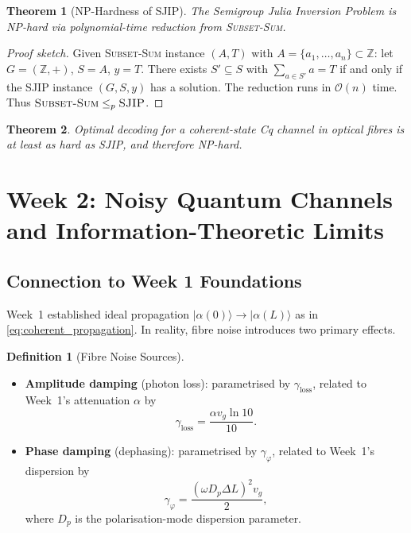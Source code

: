 \documentclass[journal,twocolumn]{IEEEtran}
\theoremstyle{definition}
\newtheorem{definition}{Definition}[section]
\theoremstyle{plain}
\newtheorem{theorem}{Theorem}[section]
\newcommand{\Z}{\mathbb{Z}}
\begin{document}
\begin{theorem}[NP-Hardness of SJIP]
The Semigroup Julia Inversion Problem is NP-hard via polynomial-time
reduction from \textsc{Subset-Sum}.
\end{theorem}

\begin{proof}[Proof sketch]
Given \textsc{Subset-Sum} instance $(A,T)$ with
$A=\{a_1,\dots,a_n\}\subset\Z$: let $G=(\Z,+)$, $S=A$, $y=T$.
There exists $S'\subseteq S$ with $\sum_{a\in S'}a=T$ if and only if
the SJIP instance $(G,S,y)$ has a solution. The reduction runs in
$\mathcal{O}(n)$ time. Thus
$\textsc{Subset-Sum}\le_p\textsc{SJIP}$.
\end{proof}

\begin{theorem}
Optimal decoding for a coherent-state Cq channel in optical fibres is
at least as hard as SJIP, and therefore NP-hard.
\end{theorem}

\section{Week 2: Noisy Quantum Channels and Information-Theoretic Limits}

\subsection{Connection to Week 1 Foundations}

Week~1 established ideal propagation
$|\alpha(0)\rangle\to|\alpha(L)\rangle$ as in
\cref{eq:coherent_propagation}. In reality, fibre noise introduces two
primary effects.

\begin{definition}[Fibre Noise Sources]
\begin{itemize}[leftmargin=*,itemsep=2pt]
  \item \textbf{Amplitude damping} (photon loss): parametrised by
    $\gamma_{\mathrm{loss}}$, related to Week~1's attenuation $\alpha$ by
    \begin{equation}
      \gamma_{\mathrm{loss}}=\frac{\alpha v_g\ln10}{10}.
      \label{eq:gamma_loss}
    \end{equation}
  \item \textbf{Phase damping} (dephasing): parametrised by
    $\gamma_\varphi$, related to Week~1's dispersion by
    \begin{equation}
      \gamma_\varphi=\frac{(\omega D_p\Delta L)^2 v_g}{2},
      \label{eq:gamma_phi}
    \end{equation}
    where $D_p$ is the polarisation-mode dispersion parameter.
\end{itemize}
\end{definition}
\end{document}
